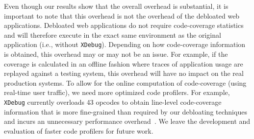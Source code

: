 \begin{table}[t]
  \centering
  \caption{Measurements of the execution time, the CPU and memory consumption for the tested web applications with XDebug and code-coverage (CC) and without XDebug. The reported values for the CPU and memory correspond to the average for each application.}
  \label{table:performance}
\end{table}

Even though our results show that the overall overhead is substantial, it is
important to note that this overhead is not the overhead of the debloated
web applications. Debloated web applications do not require code-coverage
statistics and will therefore execute in the exact same environment as
the original application (i.e., without \texttt{XDebug}). Depending on how
code-coverage information is obtained, this overhead may or may not be an
issue. For example, if the coverage is calculated in an offline fashion
where traces of application usage are replayed against a testing system,
this overhead will have no impact on the real production systems. To allow
for the online computation of code-coverage (using real-time user traffic),
we need more optimized code profilers. For example, \texttt{XDebug} currently
overloads 43 opcodes to obtain line-level code-coverage information that
is more fine-grained than required by our debloating techniques and incurs
an unnecessary performance overhead~\cite{xdebug-performance2}. We leave
the development and evaluation of faster code profilers for future work.

